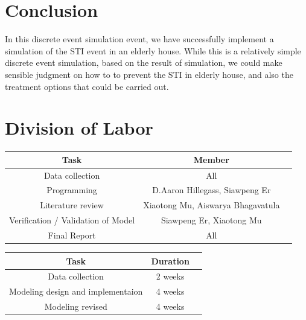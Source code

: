 \documentclass{article}
\begin{document}
\begin{normalsize}
\section{Conclusion}
In this discrete event simulation event, we have successfully implement a simulation of the STI event in an elderly house. While this is a relatively simple discrete event simulation, based on the result of  simulation, we could make sensible judgment on how to to prevent the STI in elderly house, and also the treatment options that could be carried out.


    \section{Division of Labor}
       \begin{center}
    	\begin{tabular}{ |c|c|c| } 
    		\hline
    		Task & Member  \\ 
    		\hline
    		Data collection & All \\ 
    		Programming & D.Aaron Hillegass, Siawpeng Er \\ 
    		Literature review & Xiaotong Mu, Aiswarya Bhagavatula \\ 
    		Verification / Validation of Model & Siawpeng Er, Xiaotong Mu \\
    		Final Report & All\\
    		\hline
    	\end{tabular}
    \end{center}
       
    \begin{center}
    	\begin{tabular}{ |c|c|c| } 
    		\hline
    		Task & Duration  \\ 
    		\hline
    		Data collection & 2 weeks \\ 
    		Modeling design and implementaion & 4 weeks \\ 
    		Modeling revised & 4 weeks \\ 
    		\hline
    	\end{tabular}
    \end{center}
    
    
    
    
    
\end{normalsize}
  
\end{document}
